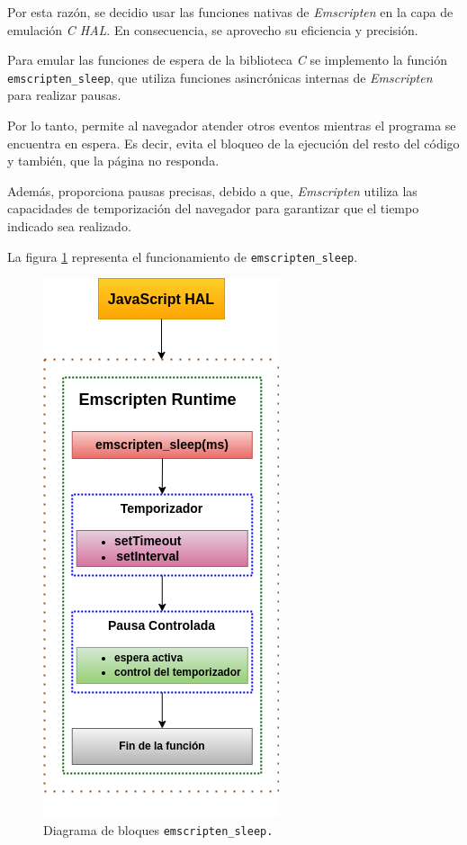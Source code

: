 Por esta razón, se decidio usar las funciones nativas de \textit{Emscripten} en la capa de emulación \textit{C HAL}. En consecuencia, se aprovecho su eficiencia y precisión.

Para emular las funciones de espera de la biblioteca \textit{C} se implemento la función \texttt{emscripten\_sleep}, que utiliza funciones asincrónicas internas de \textit{Emscripten} para realizar pausas. 

Por lo tanto, permite al navegador atender otros eventos mientras el programa se encuentra en espera. Es decir, evita el bloqueo de la ejecución del resto del código y también, que la página no responda.

Además, proporciona pausas precisas, debido a que, \textit{Emscripten}  utiliza las capacidades de temporización del navegador para garantizar que el tiempo indicado sea realizado.

La figura \ref{fig:emscriptenDelay} representa el funcionamiento de  \texttt{emscripten\_sleep}. 

\begin{figure}[ht]
	\centering
	\includegraphics[scale=.50]{./Figures/emscriptenDelay.png}
	\caption{Diagrama de bloques \texttt{emscripten\_sleep.}}
	\label{fig:emscriptenDelay}
\end{figure}

